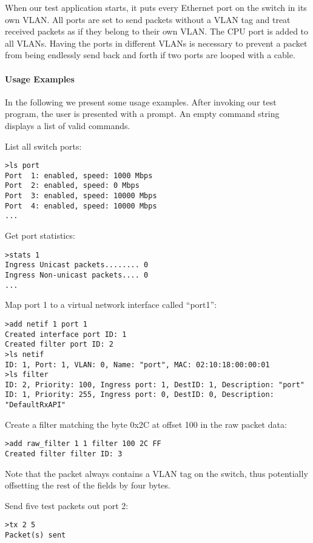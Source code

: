 \documentclass[a4paper]{article}
\begin{document}
When our test application starts, it puts every Ethernet port on the switch in its own VLAN. All ports are set to send packets without a VLAN tag and treat received packets as if they belong to their own VLAN. The CPU port is added to all VLANs. Having the ports in different VLANs is necessary to prevent a packet from being endlessly send back and forth if two ports are looped with a cable.

\paragraph{Usage Examples}
In the following we present some usage examples. After invoking our test program, the user is presented with a prompt. An empty command string displays a list of valid commands.

List all switch ports:
\begin{lstlisting}
>ls port
Port  1: enabled, speed: 1000 Mbps
Port  2: enabled, speed: 0 Mbps
Port  3: enabled, speed: 10000 Mbps
Port  4: enabled, speed: 10000 Mbps
...
\end{lstlisting}

Get port statistics:
\begin{lstlisting}
>stats 1
Ingress Unicast packets........ 0
Ingress Non-unicast packets.... 0
...
\end{lstlisting}

Map port 1 to a virtual network interface called ``port1'':
\begin{lstlisting}
>add netif 1 port 1
Created interface port ID: 1
Created filter port ID: 2
>ls netif
ID: 1, Port: 1, VLAN: 0, Name: "port", MAC: 02:10:18:00:00:01
>ls filter
ID: 2, Priority: 100, Ingress port: 1, DestID: 1, Description: "port"
ID: 1, Priority: 255, Ingress port: 0, DestID: 0, Description: "DefaultRxAPI"
\end{lstlisting}

Create a filter matching the byte 0x2C at offset 100 in the raw packet data:
\begin{lstlisting}
>add raw_filter 1 1 filter 100 2C FF
Created filter filter ID: 3
\end{lstlisting}
Note that the packet always contains a VLAN tag on the switch, thus potentially offsetting the rest of the fields by four bytes.

Send five test packets out port 2:
\begin{lstlisting}
>tx 2 5
Packet(s) sent
\end{lstlisting}

\end{document}
